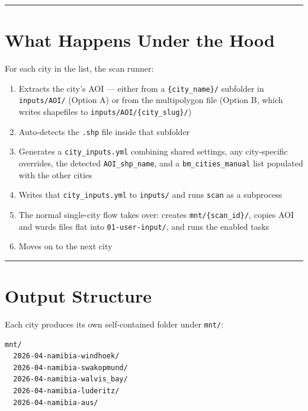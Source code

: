 \documentclass[
  letterpaper,
  DIV=11,
  numbers=noendperiod]{scrreprt}
\providecommand{\tightlist}{%
  \setlength{\itemsep}{0pt}\setlength{\parskip}{0pt}}
\begin{document}
\begin{center}\rule{0.5\linewidth}{0.5pt}\end{center}

\section{What Happens Under the Hood}\label{what-happens-under-the-hood}

For each city in the list, the scan runner:

\begin{enumerate}
\def\labelenumi{\arabic{enumi}.}
\tightlist
\item
  Extracts the city's AOI --- either from a \texttt{\{city\_name\}/}
  subfolder in \texttt{inputs/AOI/} (Option A) or from the multipolygon
  file (Option B, which writes shapefiles to
  \texttt{inputs/AOI/\{city\_slug\}/})
\item
  Auto-detects the \texttt{.shp} file inside that subfolder
\item
  Generates a \texttt{city\_inputs.yml} combining shared settings, any
  city-specific overrides, the detected \texttt{AOI\_shp\_name}, and a
  \texttt{bm\_cities\_manual} list populated with the other cities
\item
  Writes that \texttt{city\_inputs.yml} to \texttt{inputs/} and runs
  \texttt{scan} as a subprocess
\item
  The normal single-city flow takes over: creates
  \texttt{mnt/\{scan\_id\}/}, copies AOI and wards files flat into
  \texttt{01-user-input/}, and runs the enabled tasks
\item
  Moves on to the next city
\end{enumerate}

\begin{center}\rule{0.5\linewidth}{0.5pt}\end{center}

\section{Output Structure}\label{output-structure}

Each city produces its own self-contained folder under \texttt{mnt/}:

\begin{verbatim}
mnt/
  2026-04-namibia-windhoek/
  2026-04-namibia-swakopmund/
  2026-04-namibia-walvis_bay/
  2026-04-namibia-luderitz/
  2026-04-namibia-aus/
\end{verbatim}
\end{document}
